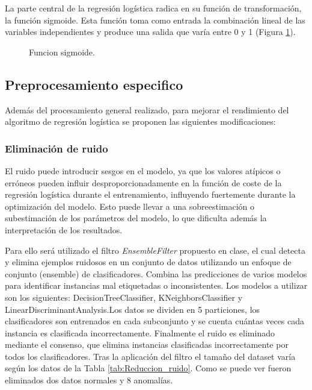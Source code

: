 \documentclass[12pt,letterpaper]{article}
\begin{document}
La parte central de la regresión logística radica en su función de transformación, la función sigmoide. Esta función toma como entrada la combinación lineal de las variables independientes y produce una salida que varía entre 0 y 1 (Figura \ref{fig:funcion_sigmoide}). 

\begin{figure}[H]
        \centering
        \caption{Funcion sigmoide.}
        \label{fig:funcion_sigmoide}
\end{figure}

\subsection{Preprocesamiento especifico}

Además del procesamiento general realizado, para mejorar el rendimiento del algoritmo de regresión logística se proponen las siguientes modificaciones:

\subsubsection{Eliminación de ruido}

El ruido puede introducir sesgos en el modelo, ya que los valores atípicos o erróneos pueden influir desproporcionadamente en la función de coste de la regresión logística durante el entrenamiento, influyendo fuertemente durante la optimización del modelo. Esto puede llevar a una sobreestimación o subestimación de los parámetros del modelo, lo que dificulta además la interpretación de los resultados. 

Para ello será utilizado el filtro \textit{EnsembleFilter} propuesto en clase, el cual detecta y elimina ejemplos ruidosos en un conjunto de datos utilizando un enfoque de conjunto (ensemble) de clasificadores. Combina las predicciones de varios modelos para identificar instancias mal etiquetadas o inconsistentes. Los modelos a utilizar son los siguientes: DecisionTreeClassifier, KNeighborsClassifier y LinearDiscriminantAnalysis.Los datos se dividen en 5 particiones, los clasificadores son entrenados en cada subconjunto y se cuenta cuántas veces cada instancia es clasificada incorrectamente. Finalmente el ruido es eliminado mediante el consenso, que elimina instancias clasificadas incorrectamente por todos los clasificadores. Tras la aplicación del filtro el tamaño del dataset varía según los datos de la Tabla \ref{tab:Reduccion_ruido}. Como se puede ver fueron eliminados dos 
datos normales y 8 anomalías.
\end{document}
